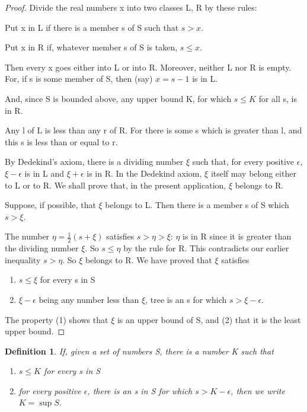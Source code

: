 \message{ !name(RealAnalysis.tex)}\documentclass[12pt]{scrbook}
\newtheorem*{definition}{Definition}
\begin{document}
\begin{proof}
Divide the real numbers x into two classes L, R by these rules:

Put x in L if there is a member s of S such that $s > x$.

Put x in R if, whatever member s of S is taken, $s \leq x$.

Then every x goes either into L or into R.  Moreover, neither L nor R is empty.  For, if s is some member of S, then (say) $ x = s - 1 $ is in L.

And, since S is bounded above, any upper bound K, for which $s \leq K$ for all s, is in R. 

Any l of L is less than any r of R.  For there is some s which is greater than l, and this s is less than or equal to r.

By Dedekind's axiom, there is a dividing number $\xi$ such that, for every positive $\epsilon$, $\xi - \epsilon$ is in L and $\xi + \epsilon$ is in R.  In the Dedekind axiom, $\xi$ itself may belong either to L or to R.  We shall prove that, in the present application, $\xi$ belongs to R.

Suppose, if possible, that $\xi$ belongs to L.  Then there is a member s of S which $s > \xi$.

The number $\eta = \frac{1}{2}(s + \xi)$ satisfies $ s > \eta > \xi$: $\eta$ is in R since it is greater than the dividing number $\xi$. So $s \leq \eta$ by the rule for R.  This contradicts our earlier inequality $s > \eta$. So $\xi$ belongs to R.  We have proved that $\xi$ satisfies
\begin{enumerate}
	\item $s \leq \xi$ for every s in S
	\item $\xi - \epsilon$ being any number less than $\xi$, tree is an s for which $s > \xi - \epsilon$.
\end{enumerate}
The property (1) shows that $\xi$ is an upper bound of S, and (2) that it is the least upper bound.  
\end{proof}

\begin{definition}
\label{def-supremum}
If, given a set of numbers S, there is a number K such that
\begin{enumerate}
	\item $s \leq K$ for every s in S
	\item for every positive $\epsilon$, there is an s in S for which $s > K - \epsilon$, then we write $K = \sup S$.
\end{enumerate}
\end{definition}
\end{document}
